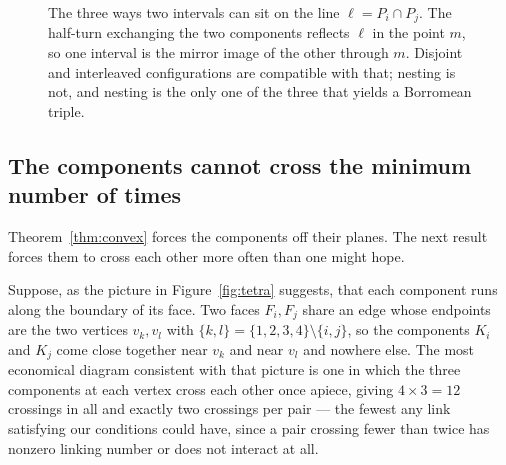 \begin{figure}[htbp]
\centering
{}
\caption{The three ways two intervals can sit on the line $\ell=P_i\cap P_j$.
The half-turn exchanging the two components reflects $\ell$ in the point $m$,
so one interval is the mirror image of the other through $m$. Disjoint and
interleaved configurations are compatible with that; nesting is not, and nesting
is the only one of the three that yields a Borromean triple.}
\label{fig:intervals}
\end{figure}

\subsection{The components cannot cross the minimum number of times}

Theorem~\ref{thm:convex} forces the components off their planes. The next
result forces them to cross each other more often than one might hope.

Suppose, as the picture in Figure~\ref{fig:tetra} suggests, that each component
runs along the boundary of its face. Two faces $F_i,F_j$ share an edge whose
endpoints are the two vertices $v_k,v_l$ with $\{k,l\}=\{1,2,3,4\}\setminus\{i,j\}$,
so the components $K_i$ and $K_j$ come close together near $v_k$ and near $v_l$
and nowhere else. The most economical diagram consistent with that picture is
one in which the three components at each vertex cross each other once apiece,
giving $4\times3=12$ crossings in all and exactly two crossings per pair --- the
fewest any link satisfying our conditions could have, since a pair crossing
fewer than twice has nonzero linking number or does not interact at all.

